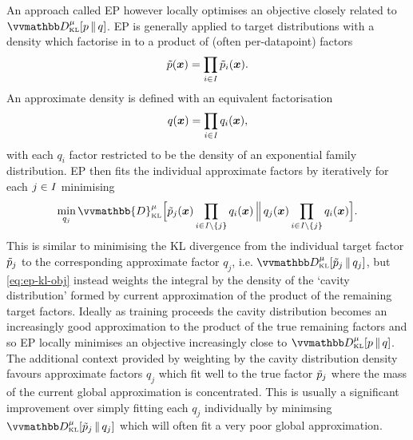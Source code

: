 An approach called \ac{EP} \citep{minka2001expectation} however locally optimises an objective closely related to $\kldiv[\mu]{\tgtdens}{q}$. \ac{EP} is generally applied to target distributions with a density which factorise in to a product of (often per-datapoint) factors
\begin{equation}\label{eq:ep-target-density-factorisation}
  \tilde{p}(\boldsymbol{x}) = \prod_{i\in\mathit{I}} \tilde{p}_i(\boldsymbol{x}).
\end{equation}
An approximate density is defined with an equivalent factorisation
\begin{equation}\label{eq:ep-approximate-density-factorisation}
  q(\boldsymbol{x}) = \prod_{i\in\mathit{I}} q_i(\boldsymbol{x}),
\end{equation}
with each $q_i$ factor restricted to be the density of an exponential family distribution. \ac{EP} then fits the individual approximate factors by iteratively for each $j \in \mathit{I}$ minimising
\begin{equation}\label{eq:ep-kl-obj}
  \min_{q_j} \vvmathbb{D}_{\scriptscriptstyle\mathrm{KL}}^{\mu}
  \Big[
    {\utgtdens_j(\vct{x}) \prod_{i\in\set{I} \setminus \fset{j}} q_i(\vct{x})}
  \,\Big\Vert\,
    {q_j(\vct{x}) \prod_{i\in\set{I} \setminus \fset{j}} q_i(\vct{x})}
  \Big].
\end{equation}
This is similar to minimising the \ac{KL} divergence from the individual target factor $\tilde{p}_j$ to the corresponding approximate factor $q_j$, i.e. $\kldiv[\mu]{\utgtdens_j}{q_j}$, but \eqref{eq:ep-kl-obj} instead weights the integral by the density of the `cavity distribution' formed by current approximation of the product of the remaining target factors. Ideally as training proceeds the cavity distribution becomes an increasingly good approximation to the product of the true remaining factors and so \ac{EP} locally minimises an objective increasingly close to $\kldiv[\mu]{\tgtdens}{q}$. The additional context provided by weighting by the cavity distribution density favours approximate factors $q_j$ which fit well to the true factor $\tilde{p}_j$ where the mass of the current global approximation is concentrated. This is usually a significant improvement over simply fitting each $q_j$ individually by minimsing $\kldiv[\mu]{\utgtdens_j}{q_j}$ which will often fit a very poor global approximation.

